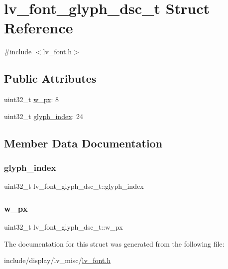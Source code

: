 \hypertarget{structlv__font__glyph__dsc__t}{}\section{lv\+\_\+font\+\_\+glyph\+\_\+dsc\+\_\+t Struct Reference}
\label{structlv__font__glyph__dsc__t}


{\ttfamily \#include $<$lv\+\_\+font.\+h$>$}

\subsection*{Public Attributes}
\begin{DoxyCompactItemize}
\item 
uint32\+\_\+t \mbox{\hyperlink{structlv__font__glyph__dsc__t_a10c8df6970785b102704f3d2ee4c2c21}{w\+\_\+px}}\+: 8
\item 
uint32\+\_\+t \mbox{\hyperlink{structlv__font__glyph__dsc__t_ab47507de5dbd699d9cf0dbfeb8210068}{glyph\+\_\+index}}\+: 24
\end{DoxyCompactItemize}


\subsection{Member Data Documentation}
\mbox{\label{structlv__font__glyph__dsc__t_ab47507de5dbd699d9cf0dbfeb8210068}} 
\subsubsection{\texorpdfstring{glyph\_index}{glyph\_index}}
{\footnotesize\ttfamily uint32\+\_\+t lv\+\_\+font\+\_\+glyph\+\_\+dsc\+\_\+t\+::glyph\+\_\+index}

\mbox{\label{structlv__font__glyph__dsc__t_a10c8df6970785b102704f3d2ee4c2c21}} 
\subsubsection{\texorpdfstring{w\_px}{w\_px}}
{\footnotesize\ttfamily uint32\+\_\+t lv\+\_\+font\+\_\+glyph\+\_\+dsc\+\_\+t\+::w\+\_\+px}



The documentation for this struct was generated from the following file\+:\begin{DoxyCompactItemize}
\item 
include/display/lv\+\_\+misc/\mbox{\hyperlink{lv__font_8h}{lv\+\_\+font.\+h}}\end{DoxyCompactItemize}
